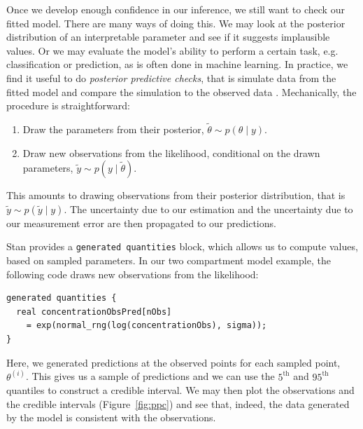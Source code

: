 Once we develop enough confidence in our inference, we still want to check our fitted model.
There are many ways of doing this.
We may look at the posterior distribution of an interpretable parameter and see if it suggests implausible values.
Or we may evaluate the model's ability to perform a certain task, e.g. classification or prediction, as is often done in machine learning.
In practice, we find it useful to do \textit{posterior predictive checks}, that is simulate data from the fitted model and compare the simulation to the observed data \cite[chapter 6]{Gelman:2013}.
%
Mechanically, the procedure is straightforward:
\begin{enumerate}
  \item Draw the parameters from their posterior, $\tilde \theta \sim p(\theta \mid y).$
  \item Draw new observations from the likelihood, conditional on the drawn parameters, $\tilde y \sim p(y \mid \tilde \theta)$.
\end{enumerate}
This amounts to drawing observations from their posterior distribution, that is $\tilde y \sim p(\tilde y \mid y)$.
The uncertainty due to our estimation and the uncertainty due to our measurement error are then propagated to our predictions.

Stan provides a \texttt{generated quantities} block, which allows us to compute values, based on sampled parameters.
In our two compartment model example, the following code draws new observations from the likelihood:
\begin{lstlisting}
generated quantities {
  real concentrationObsPred[nObs] 
    = exp(normal_rng(log(concentrationObs), sigma));
}
\end{lstlisting}
%
Here, we generated predictions at the observed points for each sampled point, $\theta^{(i)}$.
This gives us a sample of predictions and we can use the $5^\mathrm{th}$ and $95^\mathrm{th}$ quantiles to construct a credible interval.
We may then plot the observations and the credible intervals (Figure~\ref{fig:ppc}) and see that, indeed, the data generated by the model is consistent with the observations.
 
